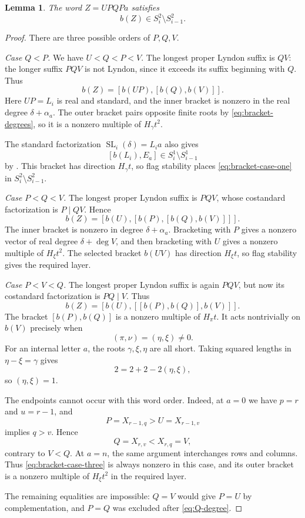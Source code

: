 \documentclass[11pt]{amsart}
\numberwithin{equation}{section}
\newtheorem{lemma}[theorem]{Lemma}
\theoremstyle{definition}
\DeclareMathOperator{\SL}{SL}
\newcommand{\br}[1]{b(#1)}
\begin{document}
\begin{lemma}\label{lem:two-bracket}
The word $Z=UPQPa$ satisfies
\[
 \br{Z}\in S_i^2\setminus S_{i-1}^2.
\]
\end{lemma}
\begin{proof}
There are three possible orders of $P,Q,V$.

\smallskip\noindent
\emph{Case $Q<P$.}
We have $U<Q<P<V$. The longest proper Lyndon suffix is $QV$: the longer suffix $PQV$ is not Lyndon, since it exceeds its suffix beginning with $Q$. Thus
\begin{equation}\label{eq:bracket-case-one}
 \br{Z}=[\br{UP},[\br{Q},\br{V}]].
\end{equation}
Here $UP=L_i$ is real and standard, and the inner bracket is nonzero in the real degree $\delta+\alpha_a$. The outer bracket pairs opposite finite roots by \eqref{eq:bracket-degrees}, so it is a nonzero multiple of $H_\gamma t^2$.

The standard factorization $\SL_i(\delta)=L_i a$ also gives
\[
 [\br{L_i},E_a]\in S_i^1\setminus S_{i-1}^1
\]
by \cite[Proposition~3.10]{ETC}. This bracket has direction $H_\gamma t$, so flag stability places \eqref{eq:bracket-case-one} in $S_i^2\setminus S_{i-1}^2$.

\smallskip\noindent
\emph{Case $P<Q<V$.}
The longest proper Lyndon suffix is $PQV$, whose costandard factorization is $P\mid QV$. Hence
\begin{equation}\label{eq:bracket-case-two}
 \br{Z}=[\br{U},[\br{P},[\br{Q},\br{V}]]].
\end{equation}
The inner bracket is nonzero in degree $\delta+\alpha_a$. Bracketing with $P$ gives a nonzero vector of real degree $\delta+\deg V$, and then bracketing with $U$ gives a nonzero multiple of $H_\xi t^2$. The selected bracket $\br{UV}$ has direction $H_\xi t$, so flag stability gives the required layer.

\smallskip\noindent
\emph{Case $P<V<Q$.}
The longest proper Lyndon suffix is again $PQV$, but now its costandard factorization is $PQ\mid V$. Thus
\begin{equation}\label{eq:bracket-case-three}
 \br{Z}=[\br{U},[[\br{P},\br{Q}],\br{V}]].
\end{equation}
The bracket $[\br{P},\br{Q}]$ is a nonzero multiple of $H_\pi t$. It acts nontrivially on $\br{V}$ precisely when
\[
 (\pi,\nu)=(\eta,\xi)\ne0.
\]
For an internal letter $a$, the roots $\gamma,\xi,\eta$ are all short. Taking squared lengths in $\eta-\xi=\gamma$ gives
\[
 2=2+2-2(\eta,\xi),
\]
so $(\eta,\xi)=1$.

The endpoints cannot occur with this word order. Indeed, at $a=0$ we have $p=r$ and $u=r-1$, and
\[
 P=X_{r-1,q}>U=X_{r-1,v}
\]
implies $q>v$. Hence
\[
 Q=X_{r,v}<X_{r,q}=V,
\]
contrary to $V<Q$. At $a=n$, the same argument interchanges rows and columns. Thus \eqref{eq:bracket-case-three} is always nonzero in this case, and its outer bracket is a nonzero multiple of $H_\xi t^2$ in the required layer.

The remaining equalities are impossible: $Q=V$ would give $P=U$ by complementation, and $P=Q$ was excluded after \eqref{eq:Q-degree}.
\end{proof}
\end{document}
